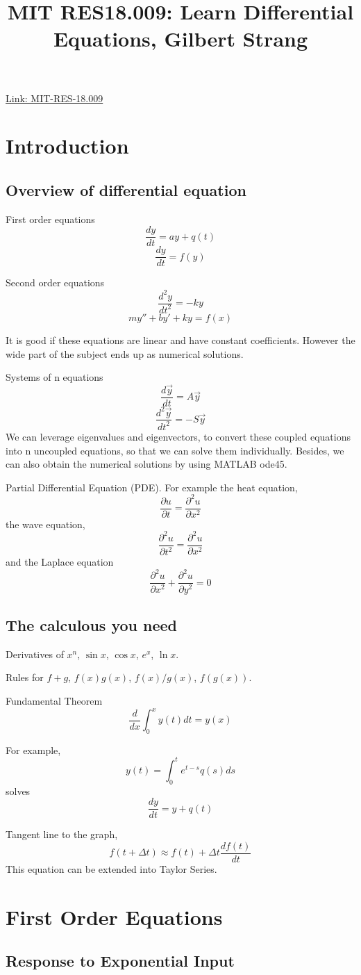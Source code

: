 \title{MIT RES18.009: Learn Differential Equations, Gilbert Strang}

\href{https://ocw.mit.edu/resources/res-18-009-learn-differential-equations-up-close-with-gilbert-strang-and-cleve-moler-fall-2015/}{Link: MIT-RES-18.009}

\section{Introduction}

\subsection{Overview of differential equation}

First order equations
$$\frac{dy}{dt} = ay + q(t)$$
$$\frac{dy}{dt} = f(y)$$

Second order equations
$$\frac{d^2y}{dt^2} = -ky$$
$$my''+by'+ky = f(x)$$

It is good if these equations are linear and have constant coefficients.
However the wide part of the subject ends up as numerical solutions.

Systems of n equations
$$\frac{d\vec{y}}{dt} = A\vec{y}$$
$$\frac{d^2\vec{y}}{dt^2} = -S\vec{y}$$
We can leverage eigenvalues and eigenvectors, to convert these coupled
equations into n uncoupled equations, so that we can solve them individually.
Besides, we can also obtain the numerical solutions by using MATLAB ode45.

Partial Differential Equation (PDE). For example the heat equation,
$$\frac{\partial u}{\partial t} = \frac{\partial^2 u}{\partial x^2}$$
the wave equation,
$$\frac{\partial^2 u}{\partial t^2} = \frac{\partial^2 u}{\partial x^2}$$
and the Laplace equation
$$\frac{\partial^2 u}{\partial x^2} + \frac{\partial^2 u}{\partial y^2} = 0$$

\subsection{The calculous you need}

Derivatives of $x^n$, $\sin x$, $\cos x$, $e^x$, $\ln x$.

Rules for $f+g$, $f(x)g(x)$, $f(x)/g(x)$, $f(g(x))$.

Fundamental Theorem
$$\frac{d}{dx} \int_0^x y(t)dt = y(x)$$

For example,
$$y(t) = \int_0^t e^{t-s} q(s) ds$$
solves
$$\frac{dy}{dt} = y + q(t)$$

Tangent line to the graph,
$$f(t+\Delta t) \approx f(t) + \Delta t \frac{df(t)}{dt}$$
This equation can be extended into Taylor Series.

\section{First Order Equations}

\subsection{Response to Exponential Input}
